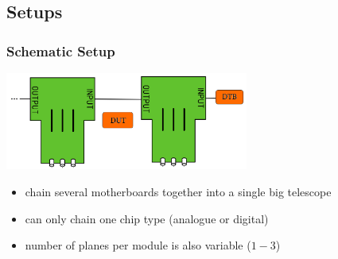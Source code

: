 \documentclass[9pt]{beamer}
\begin{document}
\subsection{Setups}
\begin{frame}
	\frametitle{Schematic Setup}
	\begin{center}
		\includegraphics[width=8cm]{Modul}
	\end{center}
	\begin{itemize}
		\item chain several motherboards together into a single big telescope
		\item can only chain one chip type (analogue or digital)
		\item number of planes per module is also variable ($1-3$)
	\end{itemize}
\end{frame}
\end{document}
